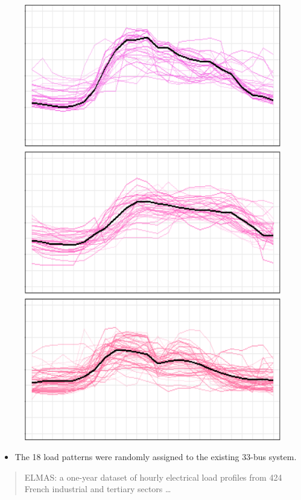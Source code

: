 \documentclass[
	11pt, %
	aspectratio=169, %
]{beamer}
\begin{document}
\begin{frame}
\begin{figure}
\begin{minipage}{0.16\textwidth}
			\includegraphics[width=\linewidth,keepaspectratio]{load_profile_6.png}
		\end{minipage}
	\end{figure}
	
	\begin{itemize}
		\item The 18 load patterns were randomly assigned to the existing 33-bus system.
	\end{itemize}
	\begin{quote}
		ELMAS: a one-year dataset of hourly electrical load profiles from 424 French industrial and tertiary sectors \ldots \parencite{Bellinguer2023}
	\end{quote}

\end{frame}
\end{document}
